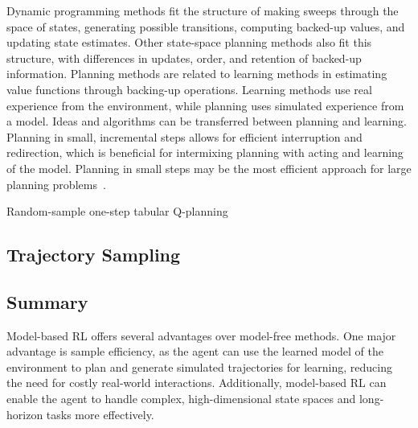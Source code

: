 \documentclass[../xlapes02]{subfiles}
\begin{document}
    Dynamic programming methods fit the structure of making sweeps through the space of states, generating possible transitions, computing backed-up values, and updating state estimates. Other state-space planning methods also fit this structure, with differences in updates, order, and retention of backed-up information. Planning methods are related to learning methods in estimating value functions through backing-up operations. Learning methods use real experience from the environment, while planning uses simulated experience from a model. Ideas and algorithms can be transferred between planning and learning. Planning in small, incremental steps allows for efficient interruption and redirection, which is beneficial for intermixing planning with acting and learning of the model. Planning in small steps may be the most efficient approach for large planning problems~\cite{sutton2018reinforcement}.
    \begin{algorithm}[H]
        \label{alg:random-sample-one-step-tabular-q-planning}
        \SetAlgoLined
        \caption{Random-sample one-step tabular Q-planning}
    \end{algorithm}

    \subsection{Trajectory Sampling}\label{subsec:trajectory-sampling}

    \subsection{Summary}\label{subsec:summary}

    Model-based RL offers several advantages over model-free methods. One major advantage is sample efficiency, as the agent can use the learned model of the environment to plan and generate simulated trajectories for learning, reducing the need for costly real-world interactions. Additionally, model-based RL can enable the agent to handle complex, high-dimensional state spaces and long-horizon tasks more effectively.
\end{document}
